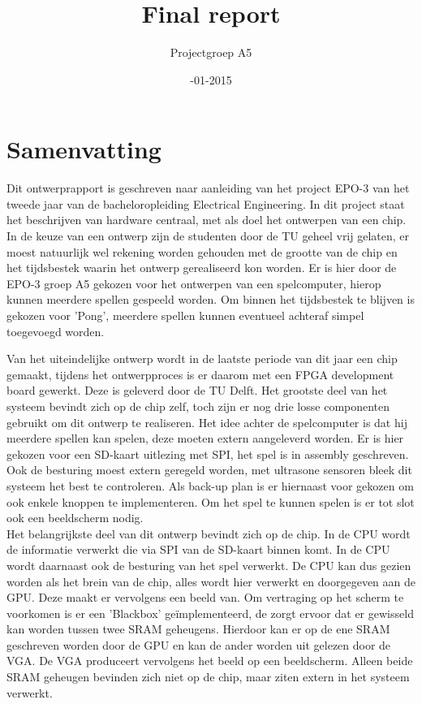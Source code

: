 \documentclass[oneside,dutch]{tudelft-report}
\title{\sffamily\Huge Final report}
\author{\sffamily\Large Projectgroep A5}
\affiliation{\sffamily TU Delft}
\date{\sffamily 14-01-2015}
\begin{document}
\maketitle

\chapter{Samenvatting}
Dit ontwerprapport is geschreven naar aanleiding van het project EPO-3 van het tweede jaar van de bacheloropleiding Electrical Engineering. In dit project staat het beschrijven van hardware centraal, met als doel het ontwerpen van een chip. In de keuze van een ontwerp zijn de studenten door de TU geheel vrij gelaten, er moest natuurlijk wel rekening worden gehouden met de grootte van de chip en het tijdsbestek waarin het ontwerp gerealiseerd kon worden. Er is hier door de EPO-3 groep A5 gekozen voor het ontwerpen van een spelcomputer, hierop kunnen meerdere spellen gespeeld worden. Om binnen het tijdsbestek te blijven is gekozen voor 'Pong', meerdere spellen kunnen eventueel achteraf simpel toegevoegd worden.

Van het uiteindelijke ontwerp wordt in de laatste periode van dit jaar een chip gemaakt, tijdens het ontwerpproces is er daarom met een FPGA development board gewerkt. Deze is geleverd door de TU Delft. Het grootste deel van het systeem bevindt zich op de chip zelf, toch zijn er nog drie losse componenten gebruikt om dit ontwerp te realiseren. Het idee achter de spelcomputer is dat hij meerdere spellen kan spelen, deze moeten extern aangeleverd worden. Er is hier gekozen voor een SD-kaart uitlezing met SPI, het spel is in assembly geschreven. Ook de besturing moest extern geregeld worden, met ultrasone sensoren bleek dit systeem het best te controleren. Als back-up plan is er hiernaast voor gekozen om ook enkele knoppen te implementeren. Om het spel te kunnen spelen is er tot slot ook een beeldscherm nodig.\\

Het belangrijkste deel van dit ontwerp bevindt zich op de chip. In de CPU wordt de informatie verwerkt die via SPI van de SD-kaart binnen komt. In de CPU wordt daarnaast ook de besturing van het spel verwerkt. De CPU kan dus gezien worden als het brein van de chip, alles wordt hier verwerkt en doorgegeven aan de GPU. Deze maakt er vervolgens een beeld van. Om vertraging op het scherm te voorkomen is er een 'Blackbox' geïmplementeerd, de zorgt ervoor dat er gewisseld kan worden tussen twee SRAM geheugens. Hierdoor kan er op de ene SRAM geschreven worden door de GPU en kan de ander worden uit gelezen door de VGA. De VGA produceert vervolgens het beeld op een beeldscherm. Alleen beide SRAM geheugen bevinden zich niet op de chip, maar ziten extern in het systeem verwerkt.\\
\end{document}
